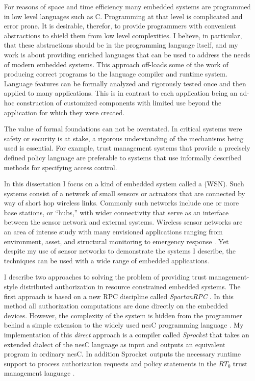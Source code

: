 For reasons of space and time efficiency many embedded systems are programmed in low level
languages such as C. Programming at that level is complicated and error prone. It is desirable,
therefor, to provide programmers with convenient abstractions to shield them from low level
complexities. I believe, in particular, that these abstractions should be in the programming
language itself, and my work is about providing enriched languages that can be used to address
the needs of modern embedded systems. This  approach off-loads some of
the work of producing correct programs to the language compiler and runtime system. Language
features can be formally analyzed and rigorously tested once and then applied to many
applications. This is in contrast to each application being an ad-hoc construction of customized
components with limited use beyond the application for which they were created.

The value of formal foundations can not be overstated. In critical systems were safety or
security is at stake, a rigorous understanding of the mechanisms being used is essential. For
example, trust management systems that provide a precisely defined policy language are
preferable to systems that use informally described methods for specifying access control.

In this dissertation I focus on a kind of embedded system called a  (WSN). Such systems consist of a network of small sensors or actuators that are
connected by way of short hop wireless links. Commonly such networks include one or more base
stations, or ``hubs,'' with wider connectivity that serve as an interface between the sensor
network and external systems. Wireless sensor networks are an area of intense study with many
envisioned applications ranging from environment, asset, and structural monitoring to emergency
response \cite{Culler:2004:GEI:1018015.1018072,1038146}. Yet despite my use of sensor networks
to demonstrate the systems I describe, the techniques can be used with a wide range of embedded
applications.

I describe two approaches to solving the problem of providing trust management-style distributed
authorization in resource constrained embedded systems. The first approach is based on a new RPC
discipline called \textit{SpartanRPC}
\cite{chapin-skalka-SpartanRPC,chapin-skalka-SpartanRPCTR}. In this method all authorization
computations are done directly on the embedded devices. However, the complexity of the system is
hidden from the programmer behind a simple extension to the widely used nesC programming
language \cite{Gay-nesC-2003}. My implementation of this \emph{direct} approach is a compiler
called \textit{Sprocket} that takes an extended dialect of the nesC language as input and
outputs an equivalent program in ordinary nesC. In addition Sprocket outputs the necessary
runtime support to process authorization requests and policy statements in the $RT_0$ trust
management language \cite{Li:DRBTMF,Li:RRBTMF}.

